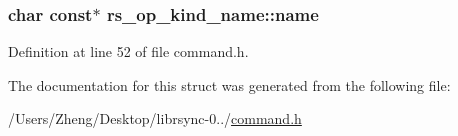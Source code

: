 \subsubsection[{name}]{\setlength{\rightskip}{0pt plus 5cm}char const$\ast$ rs\+\_\+op\+\_\+kind\+\_\+name\+::name}\label{structrs__op__kind__name_a42bca1e2e3eade13c85555ff26ce3980}


Definition at line 52 of file command.\+h.



The documentation for this struct was generated from the following file\+:\begin{DoxyCompactItemize}
\item 
/\+Users/\+Zheng/\+Desktop/librsync-\/0../\hyperlink{command_8h}{command.\+h}\end{DoxyCompactItemize}
